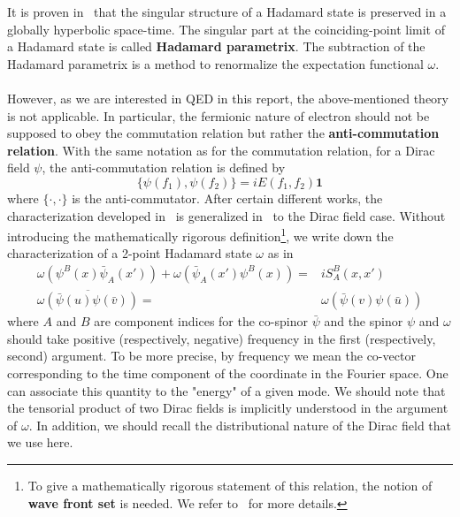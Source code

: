 It is proven in~\cite{Fulling1978} that the singular structure of a Hadamard state is preserved in a globally hyperbolic space-time. 
The singular part at the coinciding-point limit of a Hadamard state is called \textbf{Hadamard parametrix}.
The subtraction of the Hadamard parametrix is a method to renormalize the expectation functional $\omega$. \\\\
%
However, as we are interested in QED in this report, the above-mentioned theory is not applicable. 
In particular, the fermionic nature of electron should not be supposed to obey the commutation relation but rather the \textbf{anti-commutation relation}.
With the same notation as for the commutation relation, 
for a Dirac field $\psi$, the anti-commutation relation is defined by
\begin{equation*}
\{\psi(f_1), \psi(f_2)\} = i E(f_1, f_2) \mathbf{1}
\end{equation*}
where $\{\cdot, \cdot\}$ is the anti-commutator. 
After certain different works, the characterization developed in~\cite{Radzikowski1996} is generalized in~\cite{Sahlmann2000} to the Dirac field case.
Without introducing the mathematically rigorous definition\footnote{
To give a mathematically rigorous statement of this relation, 
the notion of \textbf{wave front set} is needed. 
We refer to~\cite{Radzikowski1996} for more details.
}, 
we write down the characterization of a 2-point Hadamard state $\omega$ as in~\cite{Zahn2015}
\begin{equation}\label{vacuum-hadamardcond}
\begin{split}
\omega(\psi^B(x)\bar{\psi}_A(x')) + \omega(\bar{\psi}_A(x')\psi^B(x)) = &
iS^B_A(x,x') \\
\overline{\omega(\bar{\psi}(u)\psi(\bar{v}))} = & \omega(\bar{\psi}(v)\psi(\bar{u}))
\end{split}
\end{equation}
where $A$ and $B$ are component indices for the co-spinor $\bar{\psi}$ and the spinor $\psi$ and $\omega$ should take positive (respectively, negative) frequency in the first (respectively, second) argument.
To be more precise, 
by frequency we mean the co-vector corresponding to the time component of the coordinate in the Fourier space.
One can associate this quantity to the "energy" of a given mode. 
We should note that the tensorial product of two Dirac fields is implicitly understood in the argument of $\omega$. 
In addition, we should recall the distributional nature of the Dirac field that we use here. 
